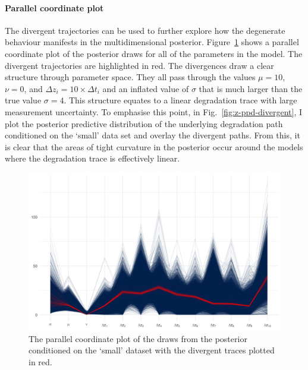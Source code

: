 \paragraph*{Parallel coordinate plot}
The divergent trajectories can be used to further explore how the degenerate behaviour manifests in the multidimensional posterior. Figure~\ref{fig:par-coord-single} shows a parallel coordinate plot of the posterior draws for all of the parameters in the model. The divergent trajectories are highlighted in red. The divergences draw a clear structure through parameter space. They all pass through the values $\mu = 10$, $\nu = 0$, and $\Delta z_i = 10 \times \Delta t_i$ and an inflated value of $\sigma$ that is much larger than the true value $\sigma = 4$. This structure equates to a linear degradation trace with large measurement uncertainty. To emphasise this point, in Fig.~\ref{fig:z-ppd-divergent}, I plot the posterior predictive distribution of the underlying degradation path conditioned on the `small' data set and overlay the divergent paths. From this, it is clear that the areas of tight curvature in the posterior occur around the models where the degradation trace is effectively linear.

\begin{figure}
  \centering
  \includegraphics[width=0.8\columnwidth]{./figures/ch-4/parcoord.png}
  \caption{The parallel coordinate plot of the draws from the posterior conditioned on the `small' dataset with the divergent traces plotted in red.}
  \label{fig:par-coord-single}
\end{figure}

